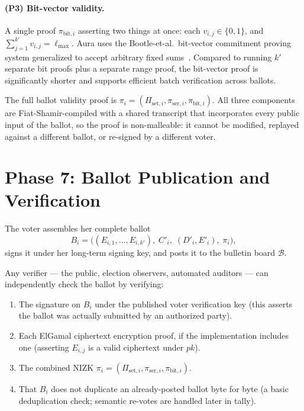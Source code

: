 \documentclass[12pt,a4paper,oneside]{report}
\begin{document}
\paragraph{(P3) Bit-vector validity.}
A single proof $\pi_{\text{bit}, i}$ asserting two things at once: 
each $v_{i, j} \in \{0, 1\}$, and $\sum_{j=1}^{k'} v_{i, j} = \ell_{\max}$. 
Aura uses the Bootle-et-al.\ bit-vector commitment proving system 
generalized to accept arbitrary fixed sums~\cite{bootle-bit-vector}. 
Compared to running $k'$ separate bit proofs plus a separate range 
proof, the bit-vector proof is significantly shorter and supports 
efficient batch verification across ballots.

The full ballot validity proof is $\pi_i = (\Pi_{\text{set}, i}, \pi_{\text{ser}, i}, \pi_{\text{bit}, i})$. 
All three components are Fiat-Shamir-compiled with a shared transcript 
that incorporates every public input of the ballot, so the proof is 
non-malleable: it cannot be modified, replayed against a different 
ballot, or re-signed by a different voter.

\section{Phase 7: Ballot Publication and Verification}
\label{sec:phase-7-publication}

The voter assembles her complete ballot
\[
    B_i = \big( (E_{i, 1}, \ldots, E_{i, k'}),\; C'_i,\; (D'_i, E'_i),\; \pi_i \big),
\]
signs it under her long-term signing key, and posts it to the bulletin 
board $\mathcal{B}$.

Any verifier --- the public, election observers, automated auditors --- 
can independently check the ballot by verifying:

\begin{enumerate}
    \item The signature on $B_i$ under the published voter verification 
    key (this asserts the ballot was actually submitted by an authorized 
    party).
    \item Each ElGamal ciphertext encryption proof, if the implementation 
    includes one (asserting $E_{i, j}$ is a valid ciphertext under $pk$).
    \item The combined NIZK $\pi_i = (\Pi_{\text{set}, i}, \pi_{\text{ser}, i}, \pi_{\text{bit}, i})$.
    \item That $B_i$ does not duplicate an already-posted ballot byte 
    for byte (a basic deduplication check; semantic re-votes are handled 
    later in tally).
\end{enumerate}
\end{document}
